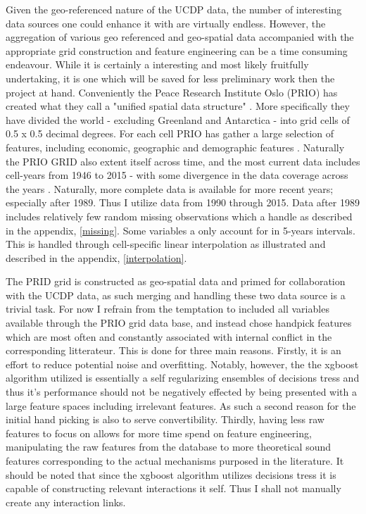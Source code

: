 \documentclass[a4paper]{article}
\begin{document}
Given the geo-referenced nature of the UCDP data, the number of interesting data sources one could enhance it with are virtually endless. However, the aggregation of various geo referenced and geo-spatial data accompanied with the appropriate grid construction and feature engineering can be a time consuming endeavour. While it is certainly a interesting and most likely fruitfully undertaking, it is one which will be saved for less preliminary work then the project at hand. Conveniently the Peace Research Institute Oslo (PRIO) has created what they call a "unified spatial data structure" \cite[1]{Tollefsen_2012}. More specifically they have divided the world - excluding Greenland and Antarctica - into grid cells of 0.5 x 0.5 decimal degrees. For each cell PRIO has gather a large selection of features, including economic, geographic and demographic features \citep{Tollefsen_2012}. Naturally the PRIO GRID also extent itself across time, and the most current data includes cell-years from 1946 to 2015 - with some divergence in the data coverage across the years \citep{Tollefsen_2016}. Naturally, more complete data is available for more recent years; especially after 1989. Thus I utilize data from 1990 through 2015. Data after 1989 includes relatively few random missing observations which a handle as described in the appendix, \autoref{missing}. Some variables a only account for in 5-years intervals. This is handled through cell-specific linear interpolation as illustrated and described in the appendix, \autoref{interpolation}.\par

The PRID grid is constructed as geo-spatial data and primed for collaboration with the UCDP data, as such merging and handling these two data source is a trivial task. For now I refrain from the temptation to included all variables available through the PRIO grid data base, and instead chose handpick features which are most often and constantly associated with internal conflict in the corresponding litterateur. This is done for three main reasons. Firstly, it is an effort to reduce potential noise and overfitting. Notably, however, the the xgboost algorithm utilized is essentially a self regularizing ensembles of decisions tress and thus it's performance should not be negatively effected by being presented with a large feature spaces including irrelevant features. As such a second reason for the initial hand picking is also to serve convertibility. Thirdly, having less raw features to focus on allows for more time spend on feature engineering, manipulating the raw features from the database to more theoretical sound features corresponding to the actual mechanisms purposed in the literature. It should be noted that since the xgboost algorithm utilizes decisions tress it is capable of constructing relevant interactions it self. Thus I shall not manually create any interaction links.\par
\end{document}
